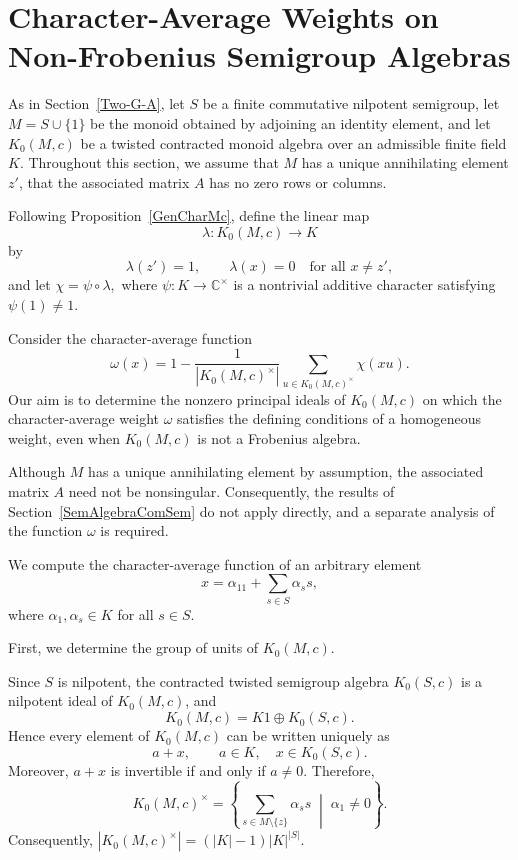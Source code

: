 \documentclass[11pt,reqno]{amsart}
\theoremstyle{plain}
\theoremstyle{remark}
\theoremstyle{definition}
\begin{document}
\section{Character-Average Weights on Non-Frobenius Semigroup Algebras}\label{SecWeight}

As in Section~\ref{Two-G-A}, let $S$ be a finite commutative nilpotent semigroup, let
\(M=S\cup\{1\}\)
be the monoid obtained by adjoining an identity element, and let
\(K_0(M,c)\)
be a twisted contracted monoid algebra over an admissible finite field $K$. 
Throughout this section, we assume that \(M\) has a unique annihilating element \(z'\), that the associated matrix \(A\) has no zero rows or columns.%


Following Proposition~\ref{GenCharMc}, define the linear map
\[
\lambda:K_0(M,c)\longrightarrow K
\]
by
\[
\lambda(z')=1,
\qquad
\lambda(x)=0
\quad\text{for all }x\neq z',
\]
and let
\(\chi=\psi\circ\lambda,\)
where $\psi:K\to\mathbb{C}^{\times}$ is a nontrivial additive character satisfying $\psi(1)\neq1$.

Consider the character-average function
\[
\omega(x)
=
1-
\frac{1}{|K_0(M,c)^\times|}
\sum_{u\in K_0(M,c)^\times}
\chi(xu).
\]
Our aim is to determine the nonzero principal ideals of \(K_0(M,c)\) on which the character-average weight \(\omega\) satisfies the defining conditions of a homogeneous weight, even when \(K_0(M,c)\) is not a Frobenius algebra.

Although \(M\) has a unique annihilating element by assumption, the associated matrix \(A\) need not be nonsingular. Consequently, the results of Section~\ref{SemAlgebraComSem} do not apply directly, and a separate analysis of the function \(\omega\) is required.

We compute the character-average function of an arbitrary element
\[x=\alpha_11+\sum_{s\in S}\alpha_ss,\]
where \(\alpha_1,\alpha_s\in K\) for all \(s\in S\).

First, we determine the group of units of \(K_0(M,c)\).

Since \(S\) is nilpotent, the contracted twisted semigroup algebra \(K_0(S,c)\) is a nilpotent ideal of \(K_0(M,c)\), and
\[K_0(M,c)=K1\oplus K_0(S,c).\]
Hence every element of \(K_0(M,c)\) can be written uniquely as
\[a+x,\qquad a\in K,\quad x\in K_0(S,c).\]
Moreover, \(a+x\) is invertible if and only if \(a\neq0\). Therefore,
\[
K_0(M,c)^{\times}
=
\left\{
\sum_{s\in M\setminus\{z\}}\alpha_s s
\;\middle|\;
\alpha_1\neq0
\right\}.
\]
Consequently,
\(|K_0(M,c)^{\times}|=(|K|-1)|K|^{|S|}.\)
\end{document}
